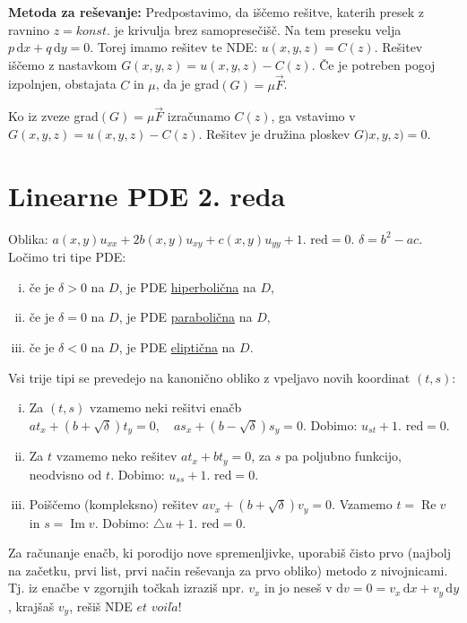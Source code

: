 \documentclass[10pt,a4paper]{amsart}
\theoremstyle{definition} %
\theoremstyle{plain} %
\newcommand{\dx}{\ensuremath{\,\mathrm{d}x}}
\newcommand{\dy}{\ensuremath{\,\mathrm{d}y}}
\begin{document}
\textbf{Metoda za reševanje:} Predpostavimo, da iščemo rešitve, katerih presek z
ravnino $z = konst.$ je krivulja brez samopresečišč. Na tem preseku velja $p\dx
+ q \dy=0$. Torej imamo rešitev te NDE: $u(x,y,z) = C(z).$ Rešitev iščemo z
nastavkom $G(x,y,z) = u(x,y,z) - C(z)$. Če je potreben pogoj izpolnjen,
obstajata $C$ in $\mu$, da je grad$(G) = \mu \vec{F}$.

Ko iz zveze grad$(G) = \mu \vec{F}$ izračunamo $C(z)$, ga vstavimo v $G(x,y,z) =
u(x,y,z) - C(z)$. Rešitev je družina ploskev $G)x,y,z) = 0$.


\section*{Linearne PDE 2. reda}

Oblika: $a(x,y)u_{xx} + 2b(x,y)u_{xy} + c(x,y)u_{yy} + 1. \text{ red} = 0$.
$\delta = b^2 -ac$. Ločimo tri tipe PDE:

\begin{enumerate}[(i)]
  \item če je $\delta > 0 $ na $D$, je PDE \underline{hiperbolična} na $D$,
  \item če je $\delta = 0 $ na $D$, je PDE \underline{parabolična} na $D$,
  \item če je $\delta < 0 $ na $D$, je PDE \underline{eliptična} na $D$.
\end{enumerate}

Vsi trije tipi se prevedejo na kanonično obliko z vpeljavo novih koordinat
$(t,s)$:

\begin{enumerate}[(i)]
  \item Za $(t,s)$ vzamemo neki rešitvi enačb $at_x + (b+\sqrt{\delta})t_y=0,
    \quad as_x + (b-\sqrt{\delta})s_y =0.$ Dobimo: $u_{st} + 1. \text{ red} = 0.$
  \item Za $t$ vzamemo neko rešitev $at_x + bt_y = 0$, za $s$ pa poljubno
    funkcijo, neodvisno od $t$. Dobimo: $u_{ss}+ 1. \text{ red}=0$.
  \item Poiščemo (kompleksno) rešitev $av_x + (b+\sqrt{\delta})v_y = 0$. Vzamemo
    $t = \operatorname{Re}v$ in $s = \operatorname{Im}v$. Dobimo: $\triangle u+
    1. \text{ red}=0$.
\end{enumerate} Za računanje enačb, ki porodijo nove spremenljivke, uporabiš
čisto prvo (najbolj na začetku, prvi list, prvi način reševanja za prvo obliko)
metodo z nivojnicami. Tj. iz enačbe v zgornjih točkah izraziš npr. $v_x$ in jo
neseš v $\text{d}v = 0 = v_x\dx + v_y \dy$, krajšaš $v_y$, rešiš NDE $et$
$voil\grave{a}$!
\end{document}
